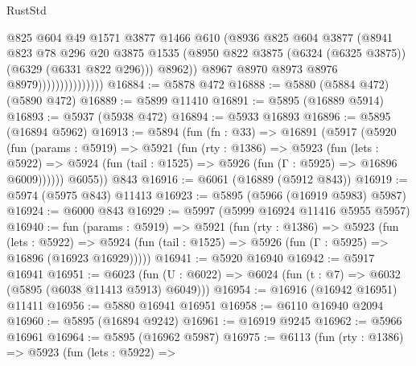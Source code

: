 \begin{lexlean}{RustStd}
\begin{coremodule}
{{                                  @825
                                  @604
                                  @49
                                  @1571
                                  @3877
                                  @1466
                                  @610
                                  (@8936
                                    @825
                                    @604
                                    @3877
                                    (@8941
                                      @823
                                      @78
                                      @296
                                      @20
                                      @3875
                                      @1535
                                      (@8950
                                        @822
                                        @3875
                                        (@6324 (@6325 @3875))
                                        (@6329 (@6331 @822 @296)))
                                      @8962))
                                  @8967
                                  @8970
                                  @8973
                                  @8976
                                  @8979)))))))))))))))
@16884 := @5878 @472
@16888 := @5880 (@5884 @472) (@5890 @472)
@16889 := @5899 @11410
@16891 := @5895 (@16889 @5914)
@16893 := @5937 (@5938 @472)
@16894 := @5933 @16893
@16896 := @5895 (@16894 @5962)
@16913 := @5894
    (fun (fn : @33) =>
    @16891
      (@5917
        (@5920
          (fun (params : @5919) =>
          @5921
            (fun (rty : @1386) =>
            @5923
              (fun (lets : @5922) =>
              @5924 (fun (tail : @1525) => @5926 (fun (Γ : @5925) => @16896 @6009))))))
        @6055))
    @843
@16916 := @6061 (@16889 (@5912 @843))
@16919 := @5974 (@5975 @843) @11413
@16923 := @5895 (@5966 (@16919 @5983) @5987)
@16924 := @6000 @843
@16929 := @5997 (@5999 @16924 @11416 @5955 @5957)
@16940 := fun (params : @5919) =>
  @5921
    (fun (rty : @1386) =>
    @5923
      (fun (lets : @5922) =>
      @5924 (fun (tail : @1525) => @5926 (fun (Γ : @5925) => @16896 (@16923 @16929)))))
@16941 := @5920 @16940
@16942 := @5917 @16941
@16951 := @6023
    (fun (U : @6022) => @6024 (fun (t : @7) => @6032 (@5895 (@6038 @11413 @5913) @6049)))
@16954 := @16916 (@16942 @16951) @11411
@16956 := @5880 @16941 @16951
@16958 := @6110 @16940 @2094
@16960 := @5895 (@16894 @9242)
@16961 := @16919 @9245
@16962 := @5966 @16961
@16964 := @5895 (@16962 @5987)
@16975 := @6113
    (fun (rty : @1386) =>
    @5923
      (fun (lets : @5922) =>
}}
\end{coremodule}
\end{lexlean}
